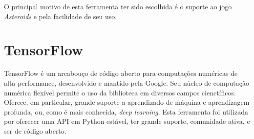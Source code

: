 O principal motivo de esta ferramenta ter sido escolhida é o suporte ao jogo \textit{Asteroids} e pela facilidade de seu uso.

\section{TensorFlow}
\label{sec:tensorflow}

TensorFlow é um arcabouço de código aberto para computações numéricas de alta performance, desenvolvido e mantido pela Google. Seu núcleo de computação numérica flexível permite o uso da biblioteca em diversos campos cienctíficos. Oferece, em particular, grande suporte a aprendizado de máquina e aprendizagem profunda, ou, como é mais conhecida, \textit{deep learning}.
Esta ferramenta foi utilizada por oferecer uma API em Python estável, ter grande suporte, comunidade ativa, e ser de código aberto.

